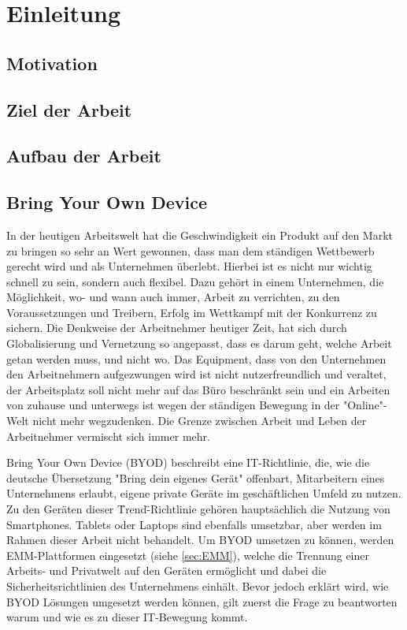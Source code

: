\chapter{Einleitung}
\label{cha:Einleitung}

\section{Motivation}
\label{sec:Motivation}

\section{Ziel der Arbeit}
\label{sec:ZielDerArbeit}

\section{Aufbau der Arbeit}
\label{sec:AufbauDerArbeit}

\section{Bring Your Own Device}
In der heutigen Arbeitswelt hat die Geschwindigkeit ein Produkt auf den Markt zu bringen so sehr an Wert gewonnen, dass man dem ständigen Wettbewerb gerecht wird und als Unternehmen überlebt. Hierbei ist es nicht nur wichtig schnell zu sein, sondern auch flexibel. Dazu gehört in einem Unternehmen, die Möglichkeit, wo- und wann auch immer, Arbeit zu verrichten, zu den Voraussetzungen und Treibern, Erfolg im Wettkampf mit der Konkurrenz zu sichern. Die Denkweise der Arbeitnehmer heutiger Zeit, hat sich durch Globalisierung und Vernetzung so angepasst, dass es darum geht, welche Arbeit getan werden muss, und nicht wo. Das Equipment, dass von den Unternehmen den Arbeitnehmern aufgezwungen wird ist nicht nutzerfreundlich und veraltet, der Arbeitsplatz soll nicht mehr auf das Büro beschränkt sein und ein Arbeiten von zuhause und unterwegs ist wegen der ständigen Bewegung in der "Online"-Welt nicht mehr wegzudenken. Die Grenze zwischen Arbeit und Leben der Arbeitnehmer vermischt sich immer mehr.

Bring Your Own Device (BYOD) beschreibt eine IT-Richtlinie, die, wie die deutsche Übersetzung "Bring dein eigenes Gerät" offenbart, Mitarbeitern eines Unternehmens erlaubt, eigene private Geräte im geschäftlichen Umfeld zu nutzen. Zu den Geräten dieser \"Trend\"-Richtlinie gehören hauptsächlich die Nutzung von Smartphones. Tablets oder Laptops sind ebenfalls umsetzbar, aber werden im Rahmen dieser Arbeit nicht behandelt. Um BYOD umsetzen zu können, werden EMM-Plattformen eingesetzt (siehe \cref{sec:EMM}), welche die Trennung einer Arbeits- und Privatwelt auf den Geräten ermöglicht und dabei die Sicherheitsrichtlinien des Unternehmens einhält. Bevor jedoch erklärt wird, wie BYOD Lösungen umgesetzt werden können, gilt zuerst die Frage zu beantworten warum und wie es zu dieser IT-Bewegung kommt.

